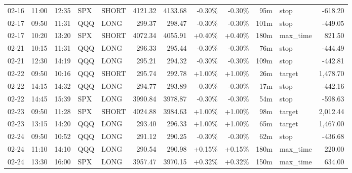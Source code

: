 \documentclass[11pt,a4paper,twoside]{article}
\begin{document}
\begin{center}
\begin{longtable}{>{\color{txtmain}}l l l l l r r r r r >{\color{txtmain}}l r}
02-16 & 11:00 & 12:35 & SPX & SHORT & 4121.32 & 4133.68 & \textcolor{lossred}{-0.30\%} & \textcolor{lossred}{-0.30\%} & 95m & stop & \textcolor{lossred}{-618.20} \\
02-17 & 09:50 & 11:31 & QQQ & LONG & 299.37 & 298.47 & \textcolor{lossred}{-0.30\%} & \textcolor{lossred}{-0.30\%} & 101m & stop & \textcolor{lossred}{-449.05} \\
02-17 & 10:20 & 13:20 & SPX & SHORT & 4072.34 & 4055.91 & \textcolor{wingreen}{+0.40\%} & \textcolor{wingreen}{+0.40\%} & 180m & max\_time & \textcolor{wingreen}{821.50} \\
02-21 & 10:15 & 11:31 & QQQ & LONG & 296.33 & 295.44 & \textcolor{lossred}{-0.30\%} & \textcolor{lossred}{-0.30\%} & 76m & stop & \textcolor{lossred}{-444.49} \\
02-21 & 12:30 & 14:19 & QQQ & LONG & 295.21 & 294.32 & \textcolor{lossred}{-0.30\%} & \textcolor{lossred}{-0.30\%} & 109m & stop & \textcolor{lossred}{-442.81} \\
02-22 & 09:50 & 10:16 & QQQ & SHORT & 295.74 & 292.78 & \textcolor{wingreen}{+1.00\%} & \textcolor{wingreen}{+1.00\%} & 26m & target & \textcolor{wingreen}{1,478.70} \\
02-22 & 14:15 & 14:32 & QQQ & LONG & 294.77 & 293.89 & \textcolor{lossred}{-0.30\%} & \textcolor{lossred}{-0.30\%} & 17m & stop & \textcolor{lossred}{-442.16} \\
02-22 & 14:45 & 15:39 & SPX & LONG & 3990.84 & 3978.87 & \textcolor{lossred}{-0.30\%} & \textcolor{lossred}{-0.30\%} & 54m & stop & \textcolor{lossred}{-598.63} \\
02-23 & 09:50 & 11:28 & SPX & SHORT & 4024.88 & 3984.63 & \textcolor{wingreen}{+1.00\%} & \textcolor{wingreen}{+1.00\%} & 98m & target & \textcolor{wingreen}{2,012.44} \\
02-23 & 13:15 & 14:20 & QQQ & LONG & 293.40 & 296.33 & \textcolor{wingreen}{+1.00\%} & \textcolor{wingreen}{+1.00\%} & 65m & target & \textcolor{wingreen}{1,467.00} \\
02-24 & 09:50 & 10:52 & QQQ & LONG & 291.12 & 290.25 & \textcolor{lossred}{-0.30\%} & \textcolor{lossred}{-0.30\%} & 62m & stop & \textcolor{lossred}{-436.68} \\
02-24 & 11:10 & 14:10 & QQQ & LONG & 290.54 & 290.98 & \textcolor{wingreen}{+0.15\%} & \textcolor{wingreen}{+0.15\%} & 180m & max\_time & \textcolor{wingreen}{220.00} \\
02-24 & 13:30 & 16:00 & SPX & LONG & 3957.47 & 3970.15 & \textcolor{wingreen}{+0.32\%} & \textcolor{wingreen}{+0.32\%} & 150m & max\_time & \textcolor{wingreen}{634.00} \\

\end{longtable}
\end{center}
\end{document}
